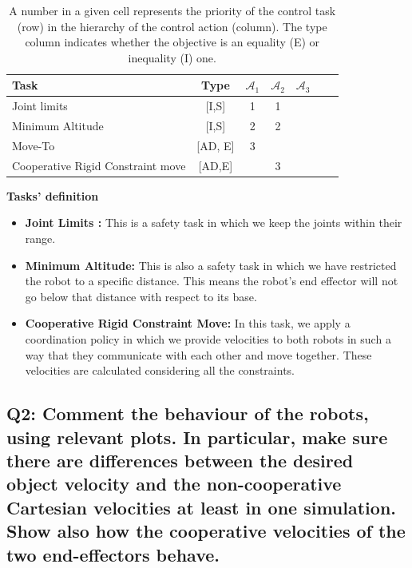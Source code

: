 \documentclass{article}
\begin{document}
\begin{table}[htb]
	\label {tbl:actions_tables}
	\begin{center}
		\footnotesize
		\begin{tabular}{lcccccc}
			\toprule		
			Task & Type & $\mathcal{A}_{1}$ & $\mathcal{A}_{2}$  & $\mathcal{A}_{3}$  \\
			\midrule
			Joint limits                      & [I,S] & 1 & 1 &  \\
			\hdashline
			Minimum Altitude						&[I,S] & 2& 2 & \\
			\hdashline 
			Move-To					&[AD, E] &3 & & \\
			\hdashline 
			Cooperative Rigid Constraint move					& [AD,E] & & 3 & \\
			
			\bottomrule
		\end{tabular}
	\end{center}
	\caption{A number in a given cell represents the priority of the control task (row) in the hierarchy of the control action (column). The type column indicates whether the objective is an equality (E) or inequality (I) one.}
\end{table}

\noindent
\textbf{Tasks' definition}
\begin{itemize}
	\item \textbf{Joint Limits :} This is a safety task in which we keep the joints within their range.
	\item \textbf{Minimum Altitude:} This is also a safety task in which we have restricted the robot to a specific distance. This means the robot's end effector will not go below that distance with respect to its base. 
	\item \textbf{Cooperative Rigid Constraint Move:} In this task, we apply a coordination policy in which we provide velocities to both robots in such a way that they communicate with each other and move together. These velocities are calculated considering all the constraints.
\end{itemize}
\subsection{Q2: Comment the behaviour of the robots, using relevant plots. In particular, make sure there are differences between the desired object velocity and the non-cooperative Cartesian velocities at least in one simulation. Show also how the cooperative velocities of the two end-effectors behave.}
\clearpage
\end{document}
